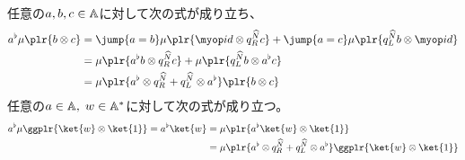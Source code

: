 {	\begin{note}\label{note:aとmuとの交換関係} %
		任意の$a,b,c\in\mathbb{A}$に対して次の式が成り立ち、
		\begin{equation*}\begin{split}
			a^\flat\mu\plr{b\otimes c} &= \jump{a=b}
				\mu\plr{\id\otimes q_R^\Nhat c}
				+ \jump{a=c}\mu\plr{q_L^\Nhat b\otimes\id} \\
			&= \mu\plr{a^\flat b\otimes q_R^\Nhat c} 
				+ \mu\plr{q_L^\Nhat b\otimes a^\flat c} \\
			&= \mu\plr{a^\flat\otimes q_R^\Nhat + q_L^\Nhat\otimes a^\flat}
				\plr{b\otimes c}
		\end{split}\end{equation*}
		任意の$a\in\mathbb{A},\; w\in\mathbb{A}^*$に対して次の式が成り立つ。
		\begin{equation*}\begin{split}
			a^\flat\mu\ggplr{\ket{w}\otimes\ket{1}} = a^\flat\ket{w}
			&= \mu\plr{a^\flat\ket{w}\otimes\ket{1}} \\
			&= \mu\plr{a^\flat\otimes q_R^\Nhat + q_L^\Nhat\otimes a^\flat}
				\ggplr{\ket{w}\otimes\ket{1}}
		\end{split}\end{equation*}
	\end{note} %
}
